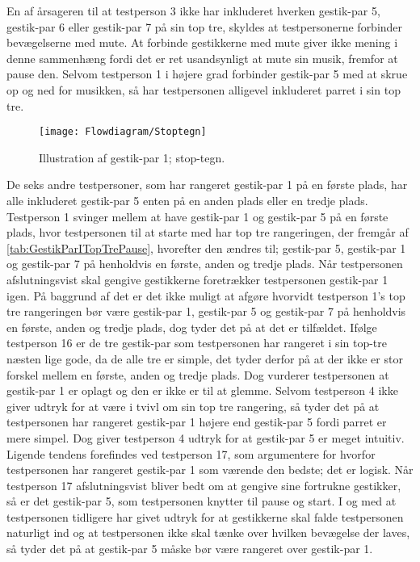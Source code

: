 En af årsageren til at testperson 3 ikke har inkluderet hverken gestik-par 5, gestik-par 6 eller gestik-par 7 på sin top tre, skyldes at testpersonerne forbinder bevægelserne med mute. At forbinde gestikkerne med mute giver ikke mening i denne sammenhæng fordi det er ret usandsynligt at mute sin musik, fremfor at pause den. Selvom testperson 1 i højere grad forbinder gestik-par 5 med at skrue op og ned for musikken, så har testpersonen alligevel inkluderet parret i sin top tre.
%
\begin{figure}[H]
	\centering
	\texttt{[image: Flowdiagram/Stoptegn]}
	\caption{Illustration af gestik-par 1; stop-tegn.}
	\label{fig:GestikPar1Pause}
\end{figure}
\noindent
% 	 
De seks andre testpersoner, som har rangeret gestik-par 1 på en første plads, har alle inkluderet gestik-par 5 enten på en anden plads eller en tredje plads. Testperson 1 svinger mellem at have gestik-par 1 og gestik-par 5 på en første plads, hvor testpersonen til at starte med har top tre rangeringen, der fremgår af \autoref{tab:GestikParITopTrePause}, hvorefter den ændres til; gestik-par 5, gestik-par 1 og gestik-par 7 på henholdvis en første, anden og tredje plads. Når testpersonen afslutningsvist skal gengive gestikkerne foretrækker testpersonen gestik-par 1 igen. På baggrund af det er det ikke muligt at afgøre hvorvidt testperson 1's top tre rangeringen bør være gestik-par 1, gestik-par 5 og gestik-par 7 på henholdvis en første, anden og tredje plads, dog tyder det på at det er tilfældet. Ifølge testperson 16 er de tre gestik-par som testpersonen har rangeret i sin top-tre næsten lige gode, da de alle tre er simple, det tyder derfor på at der ikke er stor forskel mellem en første, anden og tredje plads. Dog vurderer testpersonen at gestik-par 1 er oplagt og den er ikke er til at glemme. Selvom testperson 4 ikke giver udtryk for at være i tvivl om sin top tre rangering, så tyder det på at testpersonen har rangeret gestik-par 1 højere end gestik-par 5 fordi parret er mere simpel. Dog giver testperson 4 udtryk for at gestik-par 5 er meget intuitiv. Ligende tendens forefindes ved testperson 17, som argumentere for hvorfor testpersonen har rangeret gestik-par 1 som værende den bedste; det er logisk. Når testperson 17 afslutningsvist bliver bedt om at gengive sine fortrukne gestikker, så er det gestik-par 5, som testpersonen knytter til pause og start. I og med at testpersonen tidligere har givet udtryk for at gestikkerne skal falde testpersonen naturligt ind og at testpersonen ikke skal tænke over hvilken bevægelse der laves, så tyder det på at gestik-par 5 måske bør være rangeret over gestik-par 1.   

